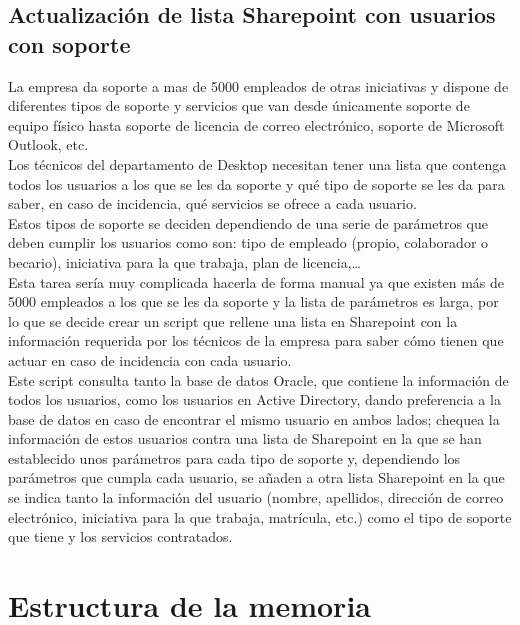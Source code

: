 \documentclass[a4paper, 12pt]{book}
\begin{document}
\subsection{Actualización de lista Sharepoint con usuarios con soporte}
\label{Actualización de lista Sharepoint con usuarios con soporte}

La empresa da soporte a mas de 5000 empleados de otras iniciativas y dispone de diferentes tipos de soporte y servicios que van desde únicamente soporte de equipo físico hasta soporte de licencia de correo electrónico, soporte de Microsoft Outlook, etc.
\\

Los técnicos del departamento de Desktop necesitan tener una lista que contenga todos los usuarios a los que se les da soporte y qué tipo de soporte se les da para saber, en caso de incidencia, qué servicios se ofrece a cada usuario.
\\

Estos tipos de soporte se deciden dependiendo de una serie de parámetros que deben cumplir los usuarios como son: tipo de empleado (propio, colaborador o becario), iniciativa para la que trabaja, plan de licencia,…
\\

Esta tarea sería muy complicada hacerla de forma manual ya que existen más de 5000 empleados a los que se les da soporte y la lista de parámetros es larga, por lo que se decide crear un script que rellene una lista en Sharepoint con la información requerida por los técnicos de la empresa para saber cómo tienen que actuar en caso de incidencia con cada usuario.
\\

Este script consulta tanto la base de datos Oracle, que contiene la información de todos los usuarios, como los usuarios en Active Directory, dando preferencia a la base de datos en caso de encontrar el mismo usuario en ambos lados; chequea la información de estos usuarios contra una lista de Sharepoint en la que se han establecido unos parámetros para cada tipo de soporte y, dependiendo los parámetros que cumpla cada usuario, se añaden a otra lista Sharepoint en la que se indica tanto la información del usuario (nombre, apellidos, dirección de correo electrónico, iniciativa para la que trabaja, matrícula, etc.) como el tipo de soporte que tiene y los servicios contratados.


\section{Estructura de la memoria}
\label{sec:estructura}
\end{document}
